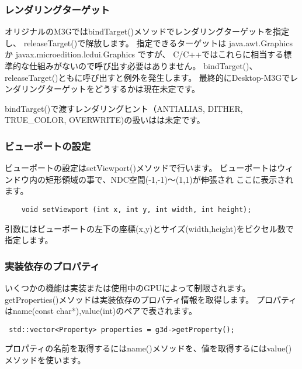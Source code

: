 \subsubsection{レンダリングターゲット}
オリジナルのM3GではbindTarget()メソッドでレンダリングターゲットを指定し、
releaseTarget()で解放します。
指定できるターゲットは java.awt.Graphics か javax.microedition.lcdui.Graphics ですが、
C/C++ではこれらに相当する標準的な仕組みがないので呼び出す必要はありません。
bindTarget()、releaseTarget()ともに呼び出すと例外を発生します。
最終的にDesktop-M3Gでレンダリングターゲットをどうするかは現在未定です。

bindTarget()で渡すレンダリングヒント（ANTIALIAS, DITHER, TRUE\_COLOR, OVERWRITE)の扱いはは未定です。

\subsubsection{ビューポートの設定}

ビューポートの設定はsetViewport()メソッドで行います。
ビューポートはウィンドウ内の矩形領域の事で、NDC空間(-1,-1)〜(1,1)が伸張され
ここに表示されます。

\begin{verbatim}
    void setViewport (int x, int y, int width, int height);
\end{verbatim}

引数にはビューポートの左下の座標(x,y)とサイズ(width,height)をピクセル数で指定します。


\subsubsection{実装依存のプロパティ}

いくつかの機能は実装または使用中のGPUによって制限されます。
getProperties()メソッドは実装依存のプロパティ情報を取得します。
プロパティはname(const char*),value(int)のペアで表されます。

\begin{verbatim}
 std::vector<Property> properties = g3d->getProperty();
\end{verbatim}

プロパティの名前を取得するにはname()メソッドを、値を取得するにはvalue()メソッドを使います。


\begin{verbatim}

\end{verbatim}









